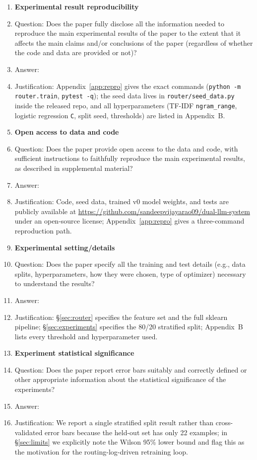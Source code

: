 \begin{enumerate}
\item {\bf Experimental result reproducibility}
    \item[] Question: Does the paper fully disclose all the information needed to reproduce the main experimental results of the paper to the extent that it affects the main claims and/or conclusions of the paper (regardless of whether the code and data are provided or not)?
    \item[] Answer: \answerYes{}
    \item[] Justification: Appendix~\ref{app:repro} gives the exact commands (\texttt{python -m router.train}, \texttt{pytest -q}); the seed data lives in \texttt{router/seed\_data.py} inside the released repo, and all hyperparameters (TF-IDF \texttt{ngram\_range}, logistic regression \texttt{C}, split seed, thresholds) are listed in Appendix~B.

\item {\bf Open access to data and code}
    \item[] Question: Does the paper provide open access to the data and code, with sufficient instructions to faithfully reproduce the main experimental results, as described in supplemental material?
    \item[] Answer: \answerYes{}
    \item[] Justification: Code, seed data, trained v0 model weights, and tests are publicly available at \url{https://github.com/sandeepvijayarao09/dual-llm-system} under an open-source license; Appendix~\ref{app:repro} gives a three-command reproduction path.

\item {\bf Experimental setting/details}
    \item[] Question: Does the paper specify all the training and test details (e.g., data splits, hyperparameters, how they were chosen, type of optimizer) necessary to understand the results?
    \item[] Answer: \answerYes{}
    \item[] Justification: \S\ref{sec:router} specifies the feature set and the full sklearn pipeline; \S\ref{sec:experiments} specifies the 80/20 stratified split; Appendix~B lists every threshold and hyperparameter used.

\item {\bf Experiment statistical significance}
    \item[] Question: Does the paper report error bars suitably and correctly defined or other appropriate information about the statistical significance of the experiments?
    \item[] Answer: \answerNo{}
    \item[] Justification: We report a single stratified split result rather than cross-validated error bars because the held-out set has only 22 examples; in \S\ref{sec:limits} we explicitly note the Wilson 95\% lower bound and flag this as the motivation for the routing-log-driven retraining loop.


\end{enumerate}
